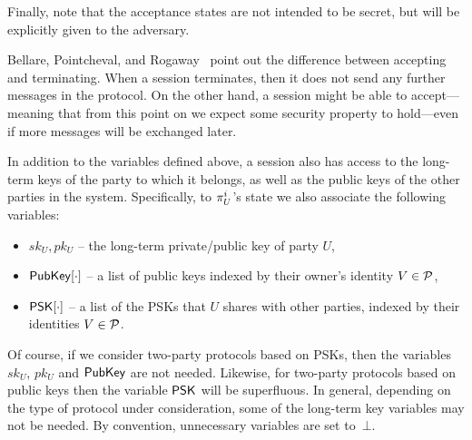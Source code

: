 Finally,
note that the acceptance states are not intended to be secret,
but will be explicitly given to the adversary.

\begin{remark}
Bellare, Pointcheval, and Rogaway~\cite[Remark~2]{EC:BelPoiRog00} point out the difference between accepting and terminating.
When a session terminates,
then it does not send any further messages in the protocol. 
On the other hand,
a session might be able to accept---meaning 
that from this point on we expect some security property to hold---even 
if more messages will be exchanged later.
\end{remark}



In addition to the variables defined above,
a session also has access to the long-term keys of the party to which it belongs,
as well as the public keys of the other parties in the system.
Specifically, to $\oracle[U][i]$'s state we also associate the following variables:
\begin{itemize}
	
	\item $sk_U,pk_U$ -- the long-term private/public key of party $U$, 
		
	\item $\mathsf{PubKey}[\cdot]$ -- a list of public keys indexed by their owner's identity $V \in \mathcal{P}$,


	\item $\mathsf{PSK}[\cdot]$ -- a list of the PSKs that $U$ shares with other parties,
	indexed by their identities $V \in \mathcal{P}$.
	
\end{itemize}

Of course,
if we consider two-party  protocols based on PSKs,
then the variables $sk_U$, $pk_U$ and $\mathsf{PubKey}$ are not needed.
Likewise,
for two-party protocols based on public keys
then the variable $\mathsf{PSK}$ will be superfluous.
In general,
depending on the type of protocol under consideration,
some of the long-term key variables may not be needed.
By convention,
unnecessary variables are set to~$\bot$. 


